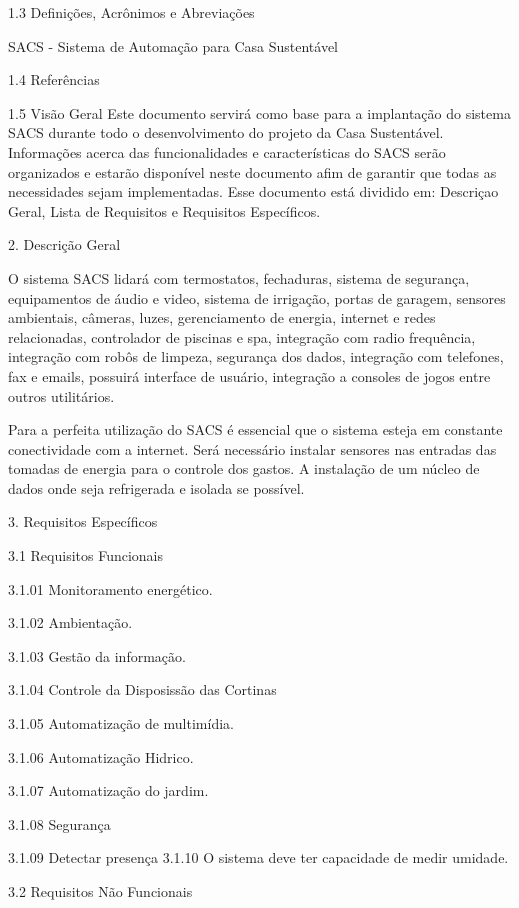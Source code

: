 1.3     Definições, Acrônimos e Abreviações
    
    SACS - Sistema de Automação para Casa Sustentável

1.4     Referências
    

1.5     Visão Geral
    Este documento servirá como base para a implantação do sistema SACS durante todo o desenvolvimento do projeto da Casa Sustentável. Informações acerca das funcionalidades e características do SACS serão organizados e estarão disponível neste documento afim de garantir que todas as necessidades sejam implementadas.
    Esse documento está dividido em: Descriçao Geral, Lista de Requisitos e Requisitos Específicos.


2.                  Descrição Geral

    O sistema SACS lidará com termostatos, fechaduras, sistema de segurança, equipamentos de áudio e video, sistema de irrigação, portas de garagem, sensores ambientais, câmeras, luzes, gerenciamento de energia, internet e redes relacionadas, controlador de piscinas e spa, integração com radio frequência, integração com robôs de limpeza, segurança dos dados, integração com telefones, fax e emails, possuirá interface de usuário, integração a consoles de jogos entre outros utilitários.

    Para a perfeita utilização do SACS é essencial que o sistema esteja em constante conectividade com a internet. Será necessário instalar sensores nas entradas das tomadas de energia para o controle dos gastos. A instalação de um núcleo de dados onde seja refrigerada e 
isolada se possível. 

3.  Requisitos Específicos

3.1     Requisitos Funcionais

3.1.01    Monitoramento energético.

3.1.02    Ambientação.

3.1.03    Gestão da informação.

3.1.04 Controle da Disposissão das Cortinas

3.1.05    Automatização de multimídia.

3.1.06    Automatização Hidrico.

3.1.07    Automatização do jardim.

3.1.08    Segurança

3.1.09 Detectar presença
3.1.10    O sistema deve ter capacidade de medir umidade.

    


3.2              Requisitos Não Funcionais
    
